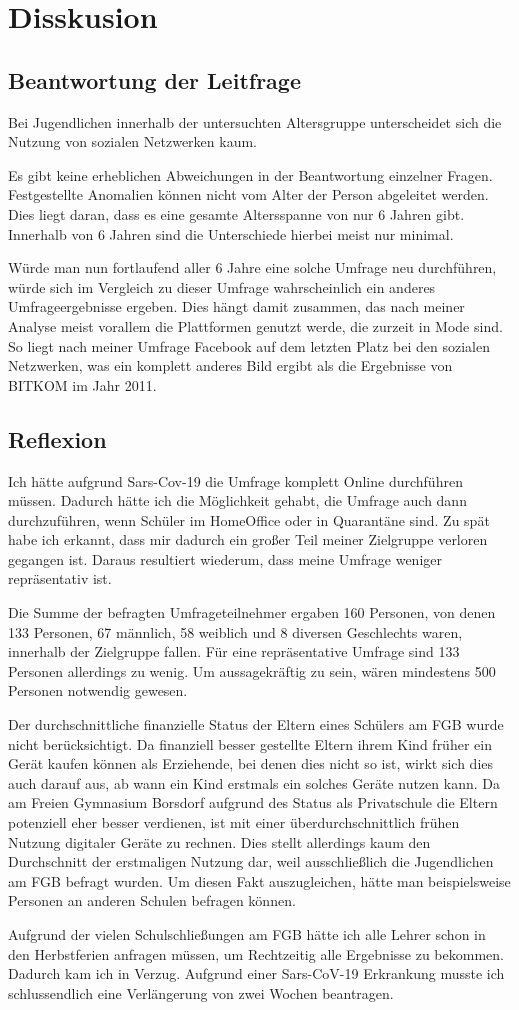 \section{Disskusion}

\subsection{Beantwortung der Leitfrage}

Bei Jugendlichen innerhalb der untersuchten Altersgruppe unterscheidet sich die Nutzung von sozialen Netzwerken kaum. 

Es gibt keine erheblichen Abweichungen in der Beantwortung einzelner Fragen. Festgestellte Anomalien  können nicht vom 
Alter der Person abgeleitet werden. Dies liegt daran, dass
es eine gesamte Altersspanne von nur 6 Jahren gibt. Innerhalb von 6 Jahren sind die Unterschiede hierbei meist nur minimal.

Würde man nun fortlaufend aller 6 Jahre eine solche Umfrage neu durchführen, würde sich im Vergleich zu dieser Umfrage wahrscheinlich 
ein anderes Umfrageergebnisse ergeben. Dies hängt damit zusammen, das nach meiner Analyse meist vorallem die Plattformen genutzt 
werde, die zurzeit in Mode sind. So liegt nach meiner Umfrage Facebook auf dem letzten Platz bei den sozialen Netzwerken, was ein 
komplett anderes Bild ergibt als die Ergebnisse von BITKOM im Jahr 2011.

\subsection{Reflexion}

Ich hätte aufgrund Sars-Cov-19 die Umfrage komplett Online durchführen müssen. Dadurch hätte ich die Möglichkeit gehabt, die Umfrage 
auch dann durchzuführen, wenn Schüler im HomeOffice oder in Quarantäne sind. Zu spät habe ich erkannt, dass mir dadurch ein großer 
Teil meiner Zielgruppe verloren gegangen ist. Daraus resultiert wiederum, dass meine Umfrage weniger repräsentativ ist.

Die Summe der befragten Umfrageteilnehmer ergaben 160 Personen, von denen 133 Personen, 67 männlich, 58 weiblich und 8 diversen 
Geschlechts waren, innerhalb der Zielgruppe fallen. 
Für eine repräsentative Umfrage sind 133 Personen allerdings zu wenig. Um aussagekräftig zu sein, wären
mindestens 500 Personen notwendig gewesen.

Der durchschnittliche finanzielle Status der Eltern eines Schülers am FGB wurde nicht berücksichtigt. Da finanziell besser 
gestellte Eltern ihrem Kind früher ein Gerät kaufen können als Erziehende, bei denen dies nicht so ist, wirkt sich dies auch darauf
aus, ab wann ein Kind erstmals ein solches Geräte nutzen kann. Da am Freien Gymnasium Borsdorf aufgrund des Status als Privatschule 
die Eltern potenziell eher besser verdienen, ist mit einer überdurchschnittlich frühen Nutzung digitaler Geräte zu rechnen. 
Dies stellt allerdings kaum den Durchschnitt der erstmaligen Nutzung dar, weil ausschließlich die Jugendlichen am FGB befragt 
wurden. Um diesen Fakt auszugleichen, hätte man beispielsweise Personen an anderen Schulen befragen können.

Aufgrund der vielen Schulschließungen am FGB hätte ich alle Lehrer schon in den Herbstferien anfragen müssen, um Rechtzeitig alle 
Ergebnisse zu bekommen. Dadurch kam ich in Verzug. Aufgrund einer Sars-CoV-19 Erkrankung musste ich schlussendlich eine
Verlängerung von zwei Wochen beantragen.